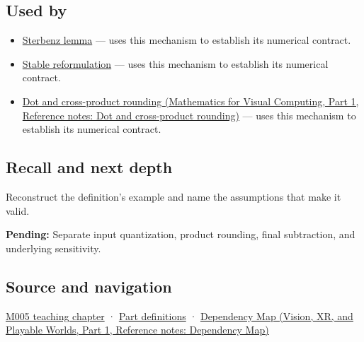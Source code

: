 \subsection{Used by}\label{appendix-a2773a6a2f9d-used-by}

\hypertarget{appendix-a2773a6a2f9d-used-by}{}

\begin{itemize}
\tightlist
\item
  \hyperref[appendix-399b7ad53f39]{Sterbenz lemma} --- uses this mechanism to establish its numerical contract.
\item
  \hyperref[appendix-d7f8ba961670]{Stable reformulation} --- uses this mechanism to establish its numerical contract.
\item
  \href{../02-Mathematics-for-Visual-Computing-P01/main.pdf\#appendix-5aef4f13483a}{Dot and cross-product rounding (Mathematics for Visual Computing, Part 1, Reference notes: Dot and cross-product rounding)} --- uses this mechanism to establish its numerical contract.
\end{itemize}

\subsection{Recall and next depth}\label{appendix-a2773a6a2f9d-recall-and-next-depth}

\hypertarget{appendix-a2773a6a2f9d-recall-and-next-depth}{}

Reconstruct the definition's example and name the assumptions that make it valid.

\textbf{Pending:} Separate input quantization, product rounding, final subtraction, and underlying sensitivity.

\subsection{Source and navigation}\label{appendix-a2773a6a2f9d-source-and-navigation}

\hypertarget{appendix-a2773a6a2f9d-source-and-navigation}{}

\hyperref[01-foundations-i-ch001-when-arithmetic-meets-uncertainty]{M005 teaching chapter} · \hyperref[appendix-fd090d982a15-m005---parts-77-88]{Part definitions} · \href{../07-Vision-XR-and-Playable-Worlds-P01/main.pdf\#appendix-4ad47bdd269a}{Dependency Map (Vision, XR, and Playable Worlds, Part 1, Reference notes: Dependency Map)}
